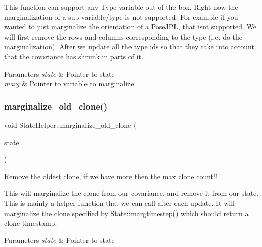 This function can support any Type variable out of the box. Right now the marginalization of a sub-\/variable/type is not supported. For example if you wanted to just marginalize the orientation of a Pose\+J\+PL, that isn\textquotesingle{}t supported. We will first remove the rows and columns corresponding to the type (i.\+e. do the marginalization). After we update all the type ids so that they take into account that the covariance has shrunk in parts of it.


\begin{DoxyParams}{Parameters}
{\em state} & Pointer to state \\
\hline
{\em marg} & Pointer to variable to marginalize \\
\hline
\end{DoxyParams}
\mbox{\label{classov__msckf_1_1StateHelper_a18f86e6da0bf5e7d4879f8c2f1460a27}} 
\subsubsection{\texorpdfstring{marginalize\+\_\+old\+\_\+clone()}{marginalize\_old\_clone()}}
{\footnotesize\ttfamily void State\+Helper\+::marginalize\+\_\+old\+\_\+clone (\begin{DoxyParamCaption}\item[{std\+::shared\+\_\+ptr$<$ \hyperlink{classov__msckf_1_1State}{State} $>$}]{state }\end{DoxyParamCaption})\hspace{0.3cm}{\ttfamily [static]}}



Remove the oldest clone, if we have more then the max clone count!! 

This will marginalize the clone from our covariance, and remove it from our state. This is mainly a helper function that we can call after each update. It will marginalize the clone specified by \hyperlink{classov__msckf_1_1State_a36420e71ffa54625667eac2a8a345582}{State\+::margtimestep()} which should return a clone timestamp.


\begin{DoxyParams}{Parameters}
{\em state} & Pointer to state \\
\hline
\end{DoxyParams}
\mbox{\label{classov__msckf_1_1StateHelper_a54f8517a288b9362f29481f650f4b959}} 
